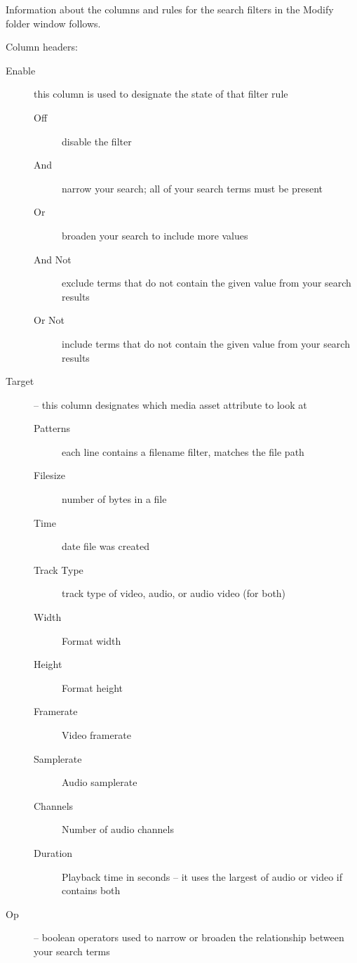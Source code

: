 Information about the columns and rules for the search filters in the Modify folder window follows.

Column headers:

\begin{description}
\item[ Enable]  this column is used to designate the state of that filter rule
    \begin{description}
        \item[ Off]		disable the filter
                \item[And] 		narrow your search; all of your search terms must be present
                \item[Or]		broaden your search to include more values
                \item[And Not]	exclude terms that do not contain the given value from your search results
                \item[Or Not]	include terms that do not contain the given value from your search results
    \end{description}
\item [Target] – this column designates which media asset attribute to look at
    \begin{description}
        \item[ Patterns]	each line contains a filename filter, matches the file path
                \item[Filesize]	number of bytes in a file
                \item[Time]		date file was created
                \item[Track Type]	track type of video, audio, or audio video (for both)
                \item[Width]	Format width
                \item[Height]	Format height
                \item[Framerate]	Video framerate
                \item[Samplerate]	Audio samplerate
                \item[Channels]	Number of audio channels
                \item[Duration]	Playback time in seconds -- it uses the largest of audio or video if contains both
    \end{description}
\item[Op] – boolean operators used to narrow or broaden the relationship between your search terms
    \begin{description}

\end{description}
\end{description}
